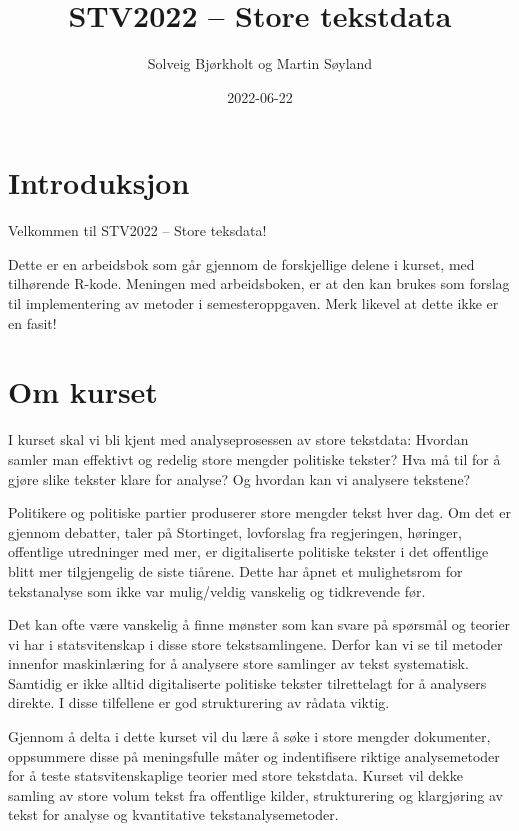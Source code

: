 \documentclass[
]{book}
\title{STV2022 -- Store tekstdata}
\author{Solveig Bjørkholt og Martin Søyland}
\date{2022-06-22}
\begin{document}
\maketitle

{
\setcounter{tocdepth}{1}
\tableofcontents
}
\hypertarget{introduksjon}{%
\chapter{Introduksjon}\label{introduksjon}}

Velkommen til STV2022 -- Store teksdata!

Dette er en arbeidsbok som går gjennom de forskjellige delene i kurset, med tilhørende R-kode. Meningen med arbeidsboken, er at den kan brukes som forslag til implementering av metoder i semesteroppgaven. Merk likevel at dette ikke er en fasit!

\hypertarget{om-kurset}{%
\chapter{Om kurset}\label{om-kurset}}

I kurset skal vi bli kjent med analyseprosessen av store tekstdata: Hvordan samler man effektivt og redelig store mengder politiske tekster? Hva må til for å gjøre slike tekster klare for analyse? Og hvordan kan vi analysere tekstene?

Politikere og politiske partier produserer store mengder tekst hver dag. Om det er gjennom debatter, taler på Stortinget, lovforslag fra regjeringen, høringer, offentlige utredninger med mer, er digitaliserte politiske tekster i det offentlige blitt mer tilgjengelig de siste tiårene. Dette har åpnet et mulighetsrom for tekstanalyse som ikke var mulig/veldig vanskelig og tidkrevende før.

Det kan ofte være vanskelig å finne mønster som kan svare på spørsmål og teorier vi har i statsvitenskap i disse store tekstsamlingene. Derfor kan vi se til metoder innenfor maskinlæring for å analysere store samlinger av tekst systematisk. Samtidig er ikke alltid digitaliserte politiske tekster tilrettelagt for å analysers direkte. I disse tilfellene er god strukturering av rådata viktig.

Gjennom å delta i dette kurset vil du lære å søke i store mengder dokumenter, oppsummere disse på meningsfulle måter og indentifisere riktige analysemetoder for å teste statsvitenskaplige teorier med store tekstdata. Kurset vil dekke samling av store volum tekst fra offentlige kilder, strukturering og klargjøring av tekst for analyse og kvantitative tekstanalysemetoder.
\end{document}
